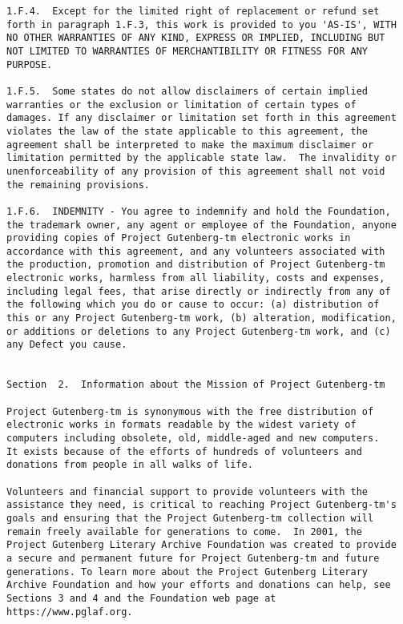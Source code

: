 \documentclass[letterpaper,12pt,oneside,openany]{memoir}
\begin{document}
\begin{verbatim}
1.F.4.  Except for the limited right of replacement or refund set
forth in paragraph 1.F.3, this work is provided to you 'AS-IS', WITH
NO OTHER WARRANTIES OF ANY KIND, EXPRESS OR IMPLIED, INCLUDING BUT
NOT LIMITED TO WARRANTIES OF MERCHANTIBILITY OR FITNESS FOR ANY
PURPOSE.

1.F.5.  Some states do not allow disclaimers of certain implied
warranties or the exclusion or limitation of certain types of
damages. If any disclaimer or limitation set forth in this agreement
violates the law of the state applicable to this agreement, the
agreement shall be interpreted to make the maximum disclaimer or
limitation permitted by the applicable state law.  The invalidity or
unenforceability of any provision of this agreement shall not void
the remaining provisions.

1.F.6.  INDEMNITY - You agree to indemnify and hold the Foundation,
the trademark owner, any agent or employee of the Foundation, anyone
providing copies of Project Gutenberg-tm electronic works in
accordance with this agreement, and any volunteers associated with
the production, promotion and distribution of Project Gutenberg-tm
electronic works, harmless from all liability, costs and expenses,
including legal fees, that arise directly or indirectly from any of
the following which you do or cause to occur: (a) distribution of
this or any Project Gutenberg-tm work, (b) alteration, modification,
or additions or deletions to any Project Gutenberg-tm work, and (c)
any Defect you cause.


Section  2.  Information about the Mission of Project Gutenberg-tm

Project Gutenberg-tm is synonymous with the free distribution of
electronic works in formats readable by the widest variety of
computers including obsolete, old, middle-aged and new computers.
It exists because of the efforts of hundreds of volunteers and
donations from people in all walks of life.

Volunteers and financial support to provide volunteers with the
assistance they need, is critical to reaching Project Gutenberg-tm's
goals and ensuring that the Project Gutenberg-tm collection will
remain freely available for generations to come.  In 2001, the
Project Gutenberg Literary Archive Foundation was created to provide
a secure and permanent future for Project Gutenberg-tm and future
generations. To learn more about the Project Gutenberg Literary
Archive Foundation and how your efforts and donations can help, see
Sections 3 and 4 and the Foundation web page at
https://www.pglaf.org.



\end{verbatim}
\end{document}
